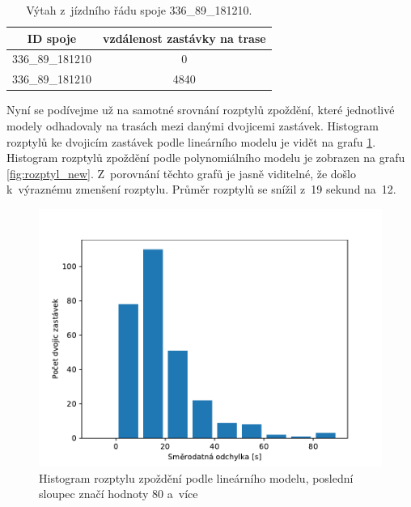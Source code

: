 \begin{center}
   \begin{table}[ht]
\centering
\begin{tabular}{|c|c|}
\hline
ID spoje & vzdálenost zastávky na trase \\ \hline \hline
336\_89\_181210 & 0 \\ \hline
336\_89\_181210 & 4840 \\ \hline
\end{tabular}
\label{tab:9270_ride}
\caption{Výtah z~jízdního řádu spoje 336\_89\_181210.}
\end{table}
\end{center}


\bigbreak


Nyní se podívejme už na samotné srovnání rozptylů zpoždění, které jednotlivé modely odhadovaly na trasách mezi danými dvojicemi zastávek. Histogram rozptylů ke dvojicím zastávek podle lineárního modelu je vidět na grafu \ref{fig:rozptyl_old}. Histogram rozptylů zpoždění podle polynomiálního modelu je zobrazen na grafu \ref{fig:rozptyl_new}. Z~porovnání těchto grafů je jasně viditelné, že došlo k~výraznému zmenšení rozptylu. Průměr rozptylů se snížil z~19 sekund na~12.


\begin{figure}
   \centering
 \includegraphics[width=\linewidth]{../img/rozptyl_old}
 \caption{Histogram rozptylu zpoždění podle lineárního modelu, poslední sloupec značí hodnoty 80 a~více}
 \label{fig:rozptyl_old}
\end{figure}


